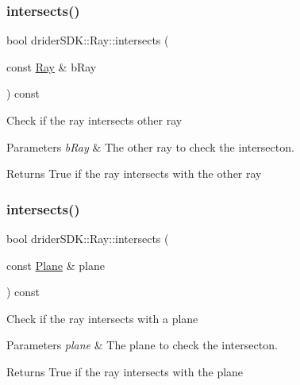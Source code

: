 \subsubsection{\texorpdfstring{intersects()}{intersects()}\hspace{0.1cm}{\footnotesize\ttfamily [1/6]}}
{\footnotesize\ttfamily bool drider\+S\+D\+K\+::\+Ray\+::intersects (\begin{DoxyParamCaption}\item[{const \hyperlink{classdrider_s_d_k_1_1_ray}{Ray} \&}]{b\+Ray }\end{DoxyParamCaption}) const}

Check if the ray intersects other ray


\begin{DoxyParams}{Parameters}
{\em b\+Ray} & The other ray to check the intersecton.\\
\hline
\end{DoxyParams}
\begin{DoxyReturn}{Returns}
True if the ray intersects with the other ray 
\end{DoxyReturn}
\mbox{\label{classdrider_s_d_k_1_1_ray_af5b4d7cdb8e422fd3808b85789122d4d}} 
\subsubsection{\texorpdfstring{intersects()}{intersects()}\hspace{0.1cm}{\footnotesize\ttfamily [2/6]}}
{\footnotesize\ttfamily bool drider\+S\+D\+K\+::\+Ray\+::intersects (\begin{DoxyParamCaption}\item[{const \hyperlink{classdrider_s_d_k_1_1_plane}{Plane} \&}]{plane }\end{DoxyParamCaption}) const}

Check if the ray intersects with a plane


\begin{DoxyParams}{Parameters}
{\em plane} & The plane to check the intersecton.\\
\hline
\end{DoxyParams}
\begin{DoxyReturn}{Returns}
True if the ray intersects with the plane 
\end{DoxyReturn}
\mbox{\label{classdrider_s_d_k_1_1_ray_a712c0636a31b4fe72f2b6cc14decf117}} 
